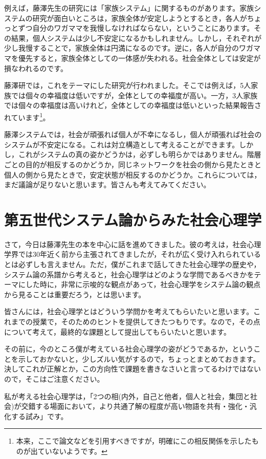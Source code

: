 \documentclass{ltjsbook}
\begin{document}
例えば，藤澤先生の研究には「家族システム」に関するものがあります。家族システムの研究が面白いところは，家族全体が安定しようとするとき，各人がちょっとずつ自分のワガママを我慢しなければならない，ということにあります。その結果，個人システムは少し不安定になるかもしれません。しかし，それぞれが少し我慢することで，家族全体は円満になるのです。逆に，各人が自分のワガママを優先すると，家族全体としての一体感が失われる。社会全体としては安定が損なわれるのです。

藤澤研では，これをテーマにした研究が行われました。そこでは例えば，5人家族では個々の幸福度は低いですが，全体としての幸福度が高い。一方，3人家族では個々の幸福度は高いけれど，全体としての幸福度は低いといった結果報告されています\footnote{本来，ここで論文などを引用すべきですが，明確にこの相反関係を示したものが出ていないようです。}。

藤澤システムでは，社会が頑張れば個人が不幸になるし，個人が頑張れば社会のシステムが不安定になる。これは対立構造として考えることができます。しかし，これがシステムの真の姿かどうかは，必ずしも明らかではありません。階層ごとの目的が相反するのかどうか，同じネットワークを社会の側から見たときと個人の側から見たときで，安定状態が相反するのかどうか。これらについては，まだ議論が足りないと思います。皆さんも考えてみてください。

\section{第五世代システム論からみた社会心理学}

さて，今日は藤澤先生の本\parencite{fujisawaNetwork}を中心に話を進めてきました。彼の考えは，社会心理学界では30年近く前から主張されてきましたが，それが広く受け入れられているとは必ずしも言えません。ただ，僕がこれまで話してきた社会心理学の歴史や，システム論の系譜から考えると，社会心理学はどのような学問であるべきかをテーマにした時に，非常に示唆的な観点があって，社会心理学をシステム論の観点から見ることは重要だろう，とは思います。

皆さんには，社会心理学とはどういう学問かを考えてもらいたいと思います。これまでの授業で，そのためのヒントを提供してきたつもりです。なので，その点について考えて，最終的な課題として提出してもらいたいと思います。

その前に，今のところ僕が考えている社会心理学の姿がどうであるか，ということを示しておかないと，少しズルい気がするので，ちょっとまとめておきます。決してこれが正解とか，この方向性で課題を書きなさいと言ってるわけではないので，そこはご注意ください。

私が考える社会心理学は，「2つの相(内外，自己と他者，個人と社会，集団と社会)が交錯する場面において，より共通了解の程度が高い物語を共有・強化・汎化する試み」です。
\end{document}

